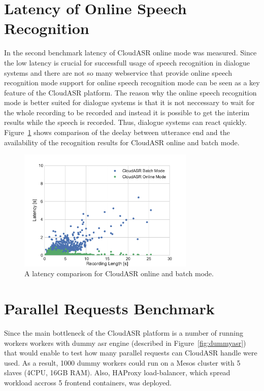 \section{Latency of Online Speech Recognition}
In the second benchmark latency of CloudASR online mode was measured.
Since the low latency is crucial for successfull usage of speech recognition in dialogue systems
  and there are not so many webservice that provide online speech recognition mode
  support for online speech recognition mode can be seen as a key feature of the CloudASR platform.
The reason why the online speech recognition mode is better suited for dialogue systems is
  that it is not neccessary to wait for the whole recording to be recorded
  and instead it is possible to get the interim results while the speech is recorded.
Thus, dialogue systems can react quickly.
Figure~\ref{fig:online-benchmark} shows comparison of the deelay between utterance end and the availability of the recognition results for CloudASR online and batch mode.


\begin{figure}[h]
  \centering
  \includegraphics[width=0.75\textwidth]{./img/online.pdf}

  \caption{
    A latency comparison for CloudASR online and batch mode.
  }
  \label{fig:online-benchmark}
\end{figure}


\section{Parallel Requests Benchmark}
Since the main bottleneck of the CloudASR platform is a number of running workers
  workers with dummy asr engine (described in Figure~\ref{fig:dummyasr})
  that would enable to test how many parallel requests can CloudASR handle were used.
As a result, 1000 dummy workers could run on a Mesos cluster with 5 slaves (4CPU, 16GB RAM).
Also, HAProxy load-balancer, which spread workload accross 5 frontend containers, was deployed.

